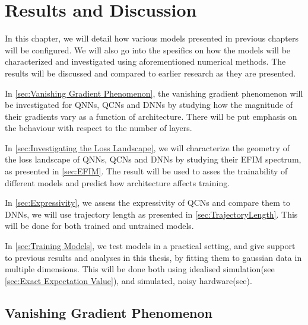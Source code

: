 \chapter{Results and Discussion}\label{chap:results_discussion}
In this chapter, we will detail how various models presented in previous chapters will be configured. We will also go into the spesifics on how the models will be characterized and investigated using aforementioned numerical methods. The results will be discussed and compared to earlier research as they are presented. 

In \autoref{sec:Vanishing Gradient Phenomenon}, the vanishing gradient phenomenon will be investigated for QNNs, QCNs and DNNs by studying how the magnitude of their gradients vary as a function of architecture. There will be put emphasis on the behaviour with respect to the number of layers.

In \autoref{sec:Investigating the Loss Landscape}, we will characterize the geometry of the loss landscape of QNNs, QCNs and DNNs by studying their EFIM spectrum, as presented in \autoref{sec:EFIM}. The result will be used to asses the trainability of different models and predict how architecture affects training.

In \autoref{sec:Expressivity}, we assess the expressivity of QCNs and compare them to DNNs, we will use trajectory length as presented in \autoref{sec:TrajectoryLength}. This will be done for both trained and untrained models.

In \autoref{sec:Training Models}, we test models in a practical setting, and give support to previous results and analyses in this thesis, by fitting them to gaussian data in multiple dimensions. This will be done both using idealised simulation(see \autoref{sec:Exact Expectation Value}), and simulated, noisy hardware(see).


\section{Vanishing Gradient Phenomenon}\label{sec:Vanishing Gradient Phenomenon}

